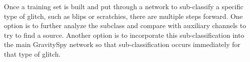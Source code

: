 \documentclass[a4paper]{article}
\begin{document}
Once a training set is built and put through a network to sub-classify a specific type of glitch, such as blips or scratchies, there are multiple steps forward. One option is to further analyze the subclass and compare with auxiliary channels to try to find a source. Another option is to incorporate this sub-classification into the main GravitySpy network so that sub-classification occurs immediately for that type of glitch. 



\end{document}
